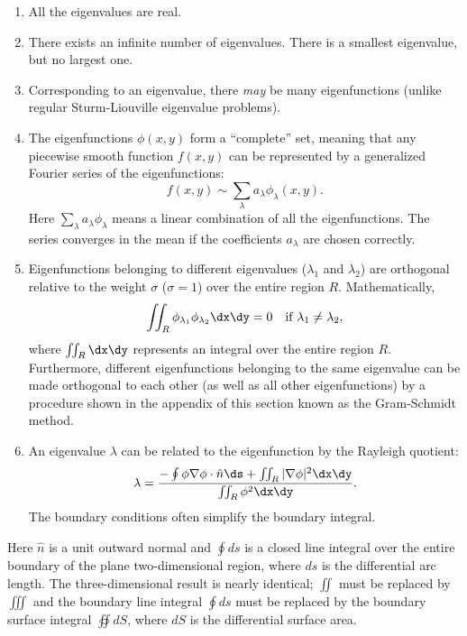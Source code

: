 \begin{enumerate}
\item All the eigenvalues are real.
\item There exists an infinite number of eigenvalues.  There is a smallest eigenvalue, but no largest one.
\item Corresponding to an eigenvalue, there \emph{may} be many eigenfunctions (unlike regular Sturm-Liouville eigenvalue problems).
\item The eigenfunctions $\phi(x,y)$ form a ``complete'' set, meaning that any piecewise smooth function $f(x,y)$ can be represented by a generalized Fourier series of the eigenfunctions:
\begin{equation}
f(x,y) \sim \sum_{\lambda} a_\lambda \phi_\lambda(x,y).
\label{eq:7.4.4}
\end{equation}
Here $\sum_\lambda a_\lambda \phi_\lambda$ means a linear combination of all the eigenfunctions.  The series converges in the mean if the coefficients $a_\lambda$ are chosen correctly.
\item Eigenfunctions belonging to different eigenvalues ($\lambda_1$ and $\lambda_2$) are orthogonal relative to the weight $\sigma$ ($\sigma = 1$) over the entire region $R$.  Mathematically,
\begin{equation}
\iint_R \phi_{\lambda_1}\phi_{\lambda_2}\dx\dy = 0 \quad\text{if } \lambda_1 \neq \lambda_2,
\label{eq:7.4.5}
\end{equation}
where $\iint_R\dx\dy$ represents an integral over the entire region $R$.  Furthermore, different eigenfunctions belonging to the same eigenvalue can be made orthogonal to each other (as well as all other eigenfunctions) by a procedure shown in the appendix of this section known as the Gram-Schmidt method.
\item An eigenvalue $\lambda$ can be related to the eigenfunction by the Rayleigh quotient:
\begin{equation}
\lambda = \frac{-\oint\phi\nabla\phi\cdot\hat{n}\ds + \iint_R |\nabla\phi|^2\dx\dy}{\iint_R \phi^2\dx\dy}.
\label{eq:7.4.6}
\end{equation}
The boundary conditions often simplify the boundary integral.
\end{enumerate}

Here $\hat{n}$ is a unit outward normal and $\oint ds$ is a closed line integral over the entire boundary of the plane two-dimensional region, where $ds$ is the differential arc length.  The three-dimensional result is nearly identical; $\iint$ must be replaced by $\iiint$ and the boundary line integral $\oint ds$ must be replaced by the boundary surface integral $\oiint dS$, where $dS$ is the differential surface area.

